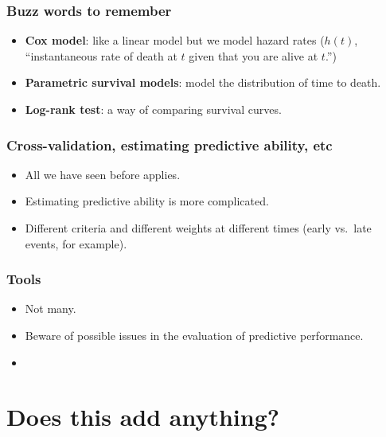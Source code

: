 \begin{frame}
  \frametitle{Buzz words to remember}
  \begin{itemize}
  \item \textbf{Cox model}: like a linear model but we model hazard rates ($h(t)$,
    ``instantaneous rate of death at $t$ given that you are alive at $t$.'')
  \item \textbf{Parametric survival models}: model the distribution of
    time to death.
  \item \textbf{Log-rank test}: a way of comparing survival curves. 
  \end{itemize}
\end{frame}




\begin{frame}
  \frametitle{Cross-validation, estimating predictive ability, etc}
  \begin{itemize}
  \item All we have seen before applies.
  \item Estimating predictive ability is more complicated.
  \item Different criteria and different weights at different times (early
    vs.\ late events, for example).
  \end{itemize}
\end{frame}


\begin{frame}
  \frametitle{Tools}
  \begin{itemize}
  \item Not many.
  \item Beware of possible issues in the evaluation of predictive performance.
  \item {}
  \end{itemize}
\end{frame}

\section[Added value]{Does this add anything?}


